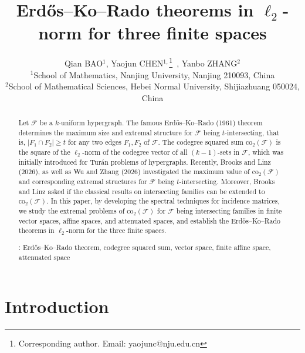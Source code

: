 \documentclass[11pt]{article}
\theoremstyle{definition}
\begin{document}
\title{Erd\H{o}s--Ko--Rado theorems in $\ell_2$-norm for three finite spaces}
\author{Qian BAO$^1$, Yaojun CHEN$^{1,}$\footnote{Corresponding author. Email: yaojunc@nju.edu.cn}~, Yanbo ZHANG$^2$\\
{\small $^1$School of Mathematics, Nanjing University, Nanjing 210093, China}\\
{\small $^2$School of Mathematical Sciences, Hebei Normal University, Shijiazhuang 050024, China}}
\date{}
\maketitle
\begin{abstract} Let $\mathcal{F}$ be a $k$-uniform hypergraph. The famous Erd\H{o}s--Ko--Rado (1961) theorem  determines the maximum size and extremal structure for $\mathcal{F}$ being $t$-intersecting, that is, 
$|F_1 \cap F_2| \ge t$ for any two edges $F_1, F_2$ of $\mathcal F$. The codegree squared sum $\mathrm{co}_2(\mathcal{F})$ is the square of the $\ell_2$-norm of the codegree vector of all $(k-1)$-sets in $\mathcal{F}$, which was initially introduced for Tur\'an problems of hypergraphs. Recently, Brooks and Linz (2026), as well as Wu and Zhang (2026) investigated 
the maximum value of $\mathrm{co}_2(\mathcal{F})$ and corresponding extremal structures for $\mathcal{F}$ being $t$-intersecting. Moreover, Brooks and Linz asked if the classical results on intersecting families can be extended to $\mathrm{co}_2(\mathcal{F})$. In this paper, by developing the spectral techniques for incidence matrices, we study the extremal problems of $\mathrm{co}_2(\mathcal{F})$ for $\mathcal{F}$ being intersecting families in finite vector spaces, affine spaces, and attenuated spaces, and establish the Erd\H{o}s--Ko--Rado theorems in $\ell_2$-norm for the three finite spaces. 




\vskip 2mm
: Erd\H{o}s--Ko--Rado theorem, codegree squared sum, vector space, finite affine space, attenuated space
\end{abstract}

\section{Introduction}

\end{document}
